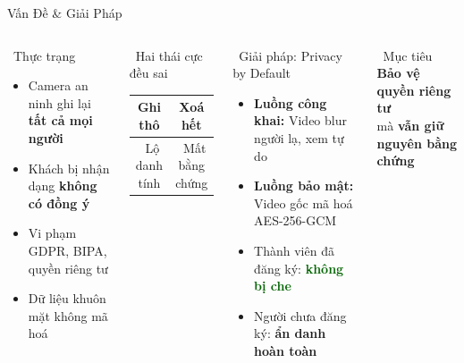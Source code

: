 \documentclass[aspectratio=169, 11pt]{beamer}
\newcommand{\xmark}{\textcolor{accent}{\ding{55}}}
\begin{document}
\begin{frame}{Vấn Đề \& Giải Pháp}
\begin{columns}[T]
\begin{alertblock}{\faExclamationTriangle\ Thực trạng}
\begin{itemize}\footnotesize
  \item Camera an ninh ghi lại \textbf{tất cả mọi người}
  \item Khách bị nhận dạng \textbf{không có đồng ý}
  \item Vi phạm GDPR, BIPA, quyền riêng tư
  \item Dữ liệu khuôn mặt không mã hoá
\end{itemize}
\end{alertblock}

\begin{alertblock}{\faTimes\ Hai thái cực đều sai}
\footnotesize\begin{center}
\begin{tabular}{cc}
\textbf{Ghi thô} & \textbf{Xoá hết} \\
\hline
\xmark\ Lộ danh tính & \xmark\ Mất bằng chứng \\
\end{tabular}
\end{center}
\end{alertblock}

\begin{block}{\faLightbulb\ Giải pháp: Privacy by Default}
\begin{itemize}\footnotesize
  \item \textbf{Luồng công khai:} Video blur người lạ, xem tự do
  \item \textbf{Luồng bảo mật:} Video gốc mã hoá AES-256-GCM
  \item Thành viên đã đăng ký: \textcolor{darkgreen}{\textbf{không bị che}}
  \item Người chưa đăng ký: \textcolor{accent}{\textbf{ẩn danh hoàn toàn}}
\end{itemize}
\end{block}

\begin{block}{\faCheckCircle\ Mục tiêu}
\centering\footnotesize
\textbf{Bảo vệ quyền riêng tư}\\
mà \textbf{vẫn giữ nguyên bằng chứng}
\end{block}
\end{columns}
\end{frame}
\end{document}
